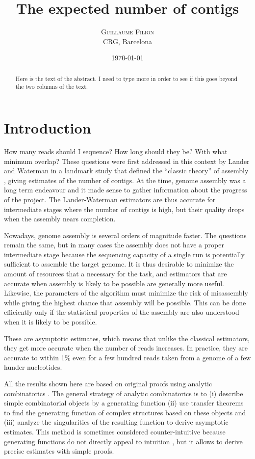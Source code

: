 \documentclass{article}
\title{The expected number of contigs}
\author{
\textsc{Guillaume Filion} \\ [1ex]
\normalsize CRG, Barcelona
}
\date{\today}
\begin{document}
\maketitle

\begin{abstract}
Here is the text of the abstract. I need to type more in order to see if
this goes beyond the two columns of the text.
\end{abstract}



\section{Introduction}

How many reads should I sequence? How long should they be? With what
minimum overlap? These questions were first addressed in this context by
Lander and Waterman in a landmark study that defined the ``classic
theory'' of assembly \cite{pmid3294162}, giving estimates of the number of
contigs. At the time, genome assembly was a long term endeavour and it
made sense to gather information about the progress of the project. The
Lander-Waterman estimators are thus accurate for intermediate stages where
the number of contigs is high, but their quality drops when the assembly
nears completion.

Nowadays, genome assembly is several orders of magnitude faster. The
questions remain the same, but in many cases the assembly does not have a
proper intermediate stage because the sequencing capacity of a single run
is potentially sufficient to assemble the target genome. It is thus
desirable to minimize the amount of resources that a necessary for the
task, and estimators that are accurate when assembly is likely to be
possible are generally more useful. Likewise, the parameters of the
algorithm must minimize the risk of misassembly while giving the highest
chance that assembly will be possible. This can be done efficiently only
if the statistical properties of the assembly are also understood when it
is likely to be possible.

These are asymptotic estimates, which means that unlike the classical
estimators, they get more accurate when the number of reads increases. In
practice, they are accurate to within 1\% even for a few hundred reads
taken from a genome of a few hunder nucleotides.

All the results shown here are based on original proofs using analytic
combinatorics \cite{AnalComb2009}. The general strategy of analytic
combinatorics is to (i) describe simple combinatorial objects by a
generating function (ii) use transfer theorems to find the generating
function of complex structures based on these objects and (iii) analyze
the singularities of the resulting function to derive asymptotic
estimates. This method is sometimes considered counter-intuitive because
generating functions do not directly appeal to intuition
\cite{AnalComb1996}, but it allows to derive precise estimates with simple
proofs.
\end{document}
